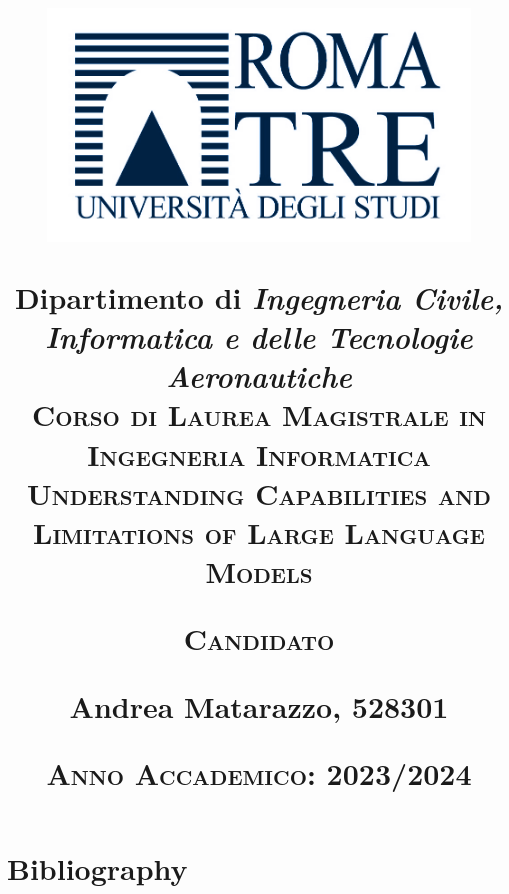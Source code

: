 \documentclass[12pt]{report}
\begin{document}
\title{
	\begin{figure}[!t]
		\centering
		\includegraphics{Logo_Roma_Tre}
	\end{figure}
	\vspace{-110pt}
	{\small Dipartimento di \textit{Ingegneria Civile, Informatica e delle Tecnologie Aeronautiche}}\\
	\vspace{10pt}
	{\large \textsc{Corso di Laurea Magistrale in Ingegneria Informatica}}\\
	\vspace{120pt}
	{\huge \textsc{Understanding Capabilities and Limitations of Large Language Models}}

	\vspace{140pt}

	 \hfill {\small \textsc{Candidato} \hspace{30pt}}

	 \hfill {\normalsize Andrea Matarazzo, 528301}

	\vspace{90pt}

	{\small \textsc{Anno Accademico}: 2023/2024}

	\date{}

}
\maketitle



\clearpage\null\thispagestyle{empty}
\tableofcontents





\clearpage\null\thispagestyle{empty}

\clearpage\null\thispagestyle{empty}


\clearpage\null\thispagestyle{empty}
\chapter*{Bibliography}
\normalem
\printbibliography[heading=none]
\end{document}
